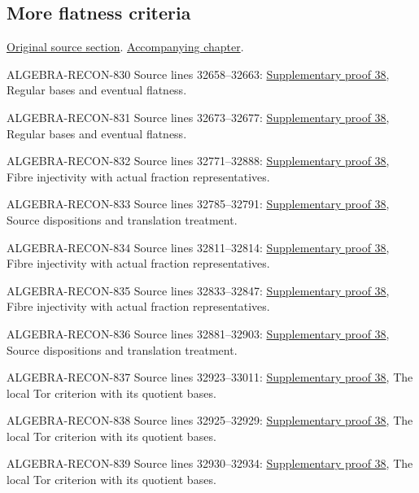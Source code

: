 \subsection{More flatness criteria}
\hypertarget{algebra-source-section-more-flatness-criteria}{}
\noindent\href{https://github.com/stacks/stacks-project/blob/a04446e57ec1fbc252a871afcec7752fb2807b14/algebra.tex\#L32643}{Original source section}. \href{algebra.pdf\#nameddest=section-more-flatness-criteria}{Accompanying chapter}.

\begin{AlgebraSourceRoutes}
\item[ALGEBRA-RECON-830] Source lines 32658--32663: \hyperlink{algebra_more_flatness_notes_20260928}{Supplementary proof 38}, Regular bases and eventual flatness.
\item[ALGEBRA-RECON-831] Source lines 32673--32677: \hyperlink{algebra_more_flatness_notes_20260928}{Supplementary proof 38}, Regular bases and eventual flatness.
\item[ALGEBRA-RECON-832] Source lines 32771--32888: \hyperlink{algebra_more_flatness_notes_20260928}{Supplementary proof 38}, Fibre injectivity with actual fraction representatives.
\item[ALGEBRA-RECON-833] Source lines 32785--32791: \hyperlink{algebra_more_flatness_notes_20260928}{Supplementary proof 38}, Source dispositions and translation treatment.
\item[ALGEBRA-RECON-834] Source lines 32811--32814: \hyperlink{algebra_more_flatness_notes_20260928}{Supplementary proof 38}, Fibre injectivity with actual fraction representatives.
\item[ALGEBRA-RECON-835] Source lines 32833--32847: \hyperlink{algebra_more_flatness_notes_20260928}{Supplementary proof 38}, Fibre injectivity with actual fraction representatives.
\item[ALGEBRA-RECON-836] Source lines 32881--32903: \hyperlink{algebra_more_flatness_notes_20260928}{Supplementary proof 38}, Source dispositions and translation treatment.
\item[ALGEBRA-RECON-837] Source lines 32923--33011: \hyperlink{algebra_more_flatness_notes_20260928}{Supplementary proof 38}, The local Tor criterion with its quotient bases.
\item[ALGEBRA-RECON-838] Source lines 32925--32929: \hyperlink{algebra_more_flatness_notes_20260928}{Supplementary proof 38}, The local Tor criterion with its quotient bases.
\item[ALGEBRA-RECON-839] Source lines 32930--32934: \hyperlink{algebra_more_flatness_notes_20260928}{Supplementary proof 38}, The local Tor criterion with its quotient bases.

\end{AlgebraSourceRoutes}
